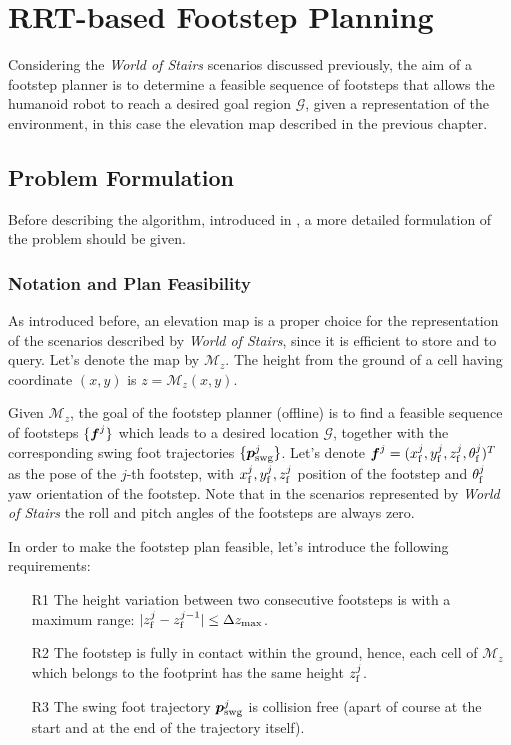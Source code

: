 \chapter{RRT-based Footstep Planning}
\label{ch:rrt-based-footstep-planning}

Considering the \textit{World of Stairs} scenarios discussed previously, the 
aim of a footstep planner is to determine a feasible sequence of footsteps that 
allows the humanoid robot to reach a desired goal region $\mathcal{G}$, given 
a representation of the environment, in this case the elevation map described in 
the previous chapter.

\section{Problem Formulation}
Before describing the algorithm, introduced in \cite{ECC19}, a more detailed 
formulation of the problem should be given.

\subsection{Notation and Plan Feasibility}
As introduced before, an 
elevation map is a proper choice for the representation of the scenarios 
described by \textit{World of Stairs}, since it is efficient to store and to 
query. Let's denote the map by $\mathcal{M}_z$. The height from the ground of
a cell having coordinate $(x, y)$ is $z = \mathcal{M}_z(x, y)$.

Given $\mathcal{M}_z$, the goal of the footstep planner (offline) is to find 
a feasible sequence of footsteps $\{{\mbox{\boldmath $f$}}^j\}$ which leads to a desired location 
$\mathcal{G}$, together with the corresponding swing foot trajectories
$\{{\mbox{\boldmath $p$}}_{\rm {swg}}^j\}$. Let's denote ${\mbox{\boldmath $f$}}^j = (x_{\rm f}^j, y_{\rm f}^j,
z_{\rm f}^j, \theta_{\rm f}^j)^T$ as the pose of the $j$-th footstep, 
with $x_{\rm f}^j, y_{\rm f}^j, z_{\rm f}^j$ position of the footstep and 
$\theta_{\rm f}^j$ yaw orientation of the footstep. Note that in the scenarios 
represented by \textit{World of Stairs} the roll and pitch angles of the 
footsteps are always zero.

In order to make the footstep plan feasible, let's introduce the following 
requirements:
\begin{itemize}
  \item[R1] The height variation between two consecutive footsteps is with 
      a maximum range: $|z_{\rm f}^j - z_{\rm f}^{j-1}| \le \Delta z_{\max}$.
  \item[R2] The footstep is fully in contact within the ground, hence,
      each cell of $\mathcal{M}_z$ which belongs to the footprint has the 
      same height $z_{\rm f}^j$.
  \item[R3] The swing foot trajectory ${\mbox{\boldmath $p$}}_{\rm {swg}}^j$ is collision free
      (apart of course at the start and at the end of the trajectory itself).
\end{itemize}

